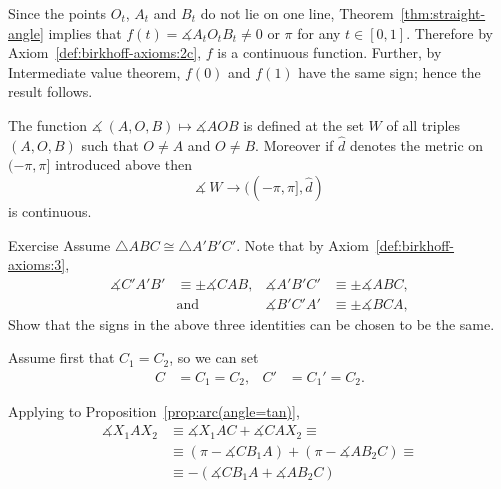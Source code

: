 Since 
the points $O_t$, $A_t$ and $B_t$ do not lie on one line,
Theorem~\ref{thm:straight-angle} implies that $f(t)=\measuredangle A_tO_tB_t\ne 0$ or $\pi$ for any $t\in[0,1]$.
Therefore by Axiom~\ref{def:birkhoff-axioms:2c},
$f$ is a continuous function.
Further,
by Intermediate value theorem, $f(0)$ and $f(1)$ have the same sign;
hence the result follows.
\qeds








\item\label{def:birkhoff-axioms:2c} 
The function $\measuredangle\:(A,O,B)\mapsto\measuredangle A O B$
is defined at the set $W$ of all triples 
$(A,O,B)$ such that $O\ne A$ and $O\ne B$.
Moreover if $\hat{d}$ denotes the metric on $(-\pi,\pi]$ introduced above then
$$\measuredangle\: W\to ((-\pi,\pi],\hat{d})$$ 
is continuous.









\begin{thm}{Exercise}\label{ex:angle-signs-in-trig}
Assume $\triangle ABC\cong\triangle A'B'C'$. 
Note that by Axiom~\ref{def:birkhoff-axioms:3},
\begin{align*}
\measuredangle C'A'B'&\equiv\pm\measuredangle CAB,
&
\measuredangle A'B'C'&\equiv\pm\measuredangle ABC,
\\
&\text{and}&\measuredangle B'C'A'&\equiv\pm\measuredangle BCA,
\end{align*}
Show that the signs in the above three identities can be chosen
to be the same. 
\end{thm}









Assume first that $C_1=C_2$, so we can set 
\begin{align*}
C&=C_1=C_2,
&
C'&=C_1'=C_2.
\end{align*}


Applying to Proposition~\ref{prop:arc(angle=tan)},
\begin{align*}
\measuredangle X_1AX_2&\equiv\measuredangle X_1AC+\measuredangle CAX_2\equiv
\\
&\equiv(\pi-\measuredangle CB_1A)+(\pi-\measuredangle AB_2 C)\equiv
\\
&
\equiv -(\measuredangle CB_1A+\measuredangle AB_2 C)
\end{align*}

